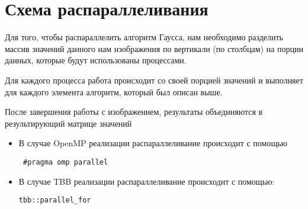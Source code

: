\documentclass{report}
\begin{document}
\section*{Схема распараллеливания}
Для того, чтобы распараллелить алгоритм Гаусса, нам необходимо разделить массив значений данного нам изображения по вертикали (по столбцам) на порции данных, которые будут использованы процессами. 
\par
Для каждого процесса работа происходит со своей порцией значений и выполняет для каждого элемента алгоритм, который был описан выше.
\par
После завершения работы с изображением, результаты объединяются в результирующий матрице значений
\begin{itemize}
\item В случае OpenMP реализации распараллеливание происходит с помощью 
 \begin{lstlisting}
 #pragma omp parallel
\end{lstlisting}
\item В случае TBB реализации распараллеливание происходит с помощью:
\begin{lstlisting}
tbb::parallel_for
\end{lstlisting}

\end{itemize}
\newpage

\end{document}
